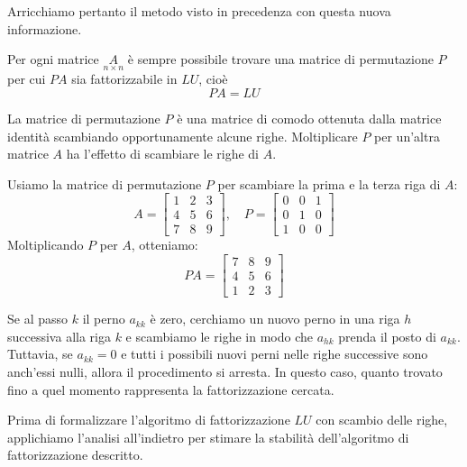 \documentclass{article}
\begin{document}
Arricchiamo pertanto il metodo visto in precedenza con questa nuova informazione.
\begin{theorem}
    Per ogni matrice $\underset{n\times n}{A}$ è sempre possibile trovare una
    matrice di permutazione $P$ per cui $PA$ sia fattorizzabile in $LU$, cioè
    $$PA=LU$$
\end{theorem}
La matrice di permutazione $P$ è una matrice di comodo ottenuta dalla matrice
identità scambiando opportunamente alcune righe. Moltiplicare $P$ per un'altra
matrice $A$ ha l'effetto di scambiare le righe di $A$.

\begin{example}
    Usiamo la matrice di permutazione $P$ per scambiare la prima e la terza
    riga di $A$:
    \begin{equation*}
           A=\begin{bmatrix}
               1 & 2 & 3 \\ 
               4 & 5 & 6 \\ 
               7 & 8 & 9
           \end{bmatrix}, 
           \quad P = \begin{bmatrix}
               0 & 0 & 1 \\ 
               0 & 1 & 0 \\ 
               1 & 0 & 0
           \end{bmatrix}  
    \end{equation*}
    Moltiplicando $P$ per $A$, otteniamo:
    \begin{equation*}
        PA = \begin{bmatrix}
            7 & 8 & 9 \\ 
            4 & 5 & 6 \\ 
            1 & 2 & 3
        \end{bmatrix}
    \end{equation*}
\end{example}

Se al passo $k$ il perno $a_{kk}$ è zero, cerchiamo un nuovo perno in una riga
$h$ successiva alla riga $k$ e scambiamo le righe in modo che $a_{hk}$ prenda
il posto di $a_{kk}$. Tuttavia, se $a_{kk}=0$ e tutti i possibili nuovi perni
nelle righe successive sono anch'essi nulli, allora il procedimento si
arresta. In questo caso, quanto trovato fino a quel momento rappresenta la
fattorizzazione cercata.


Prima di formalizzare l'algoritmo di fattorizzazione $LU$ con scambio delle
righe, applichiamo l'analisi all'indietro per stimare la stabilità
dell'algoritmo di fattorizzazione descritto.
\end{document}
